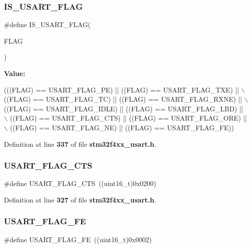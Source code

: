 \subsubsection{I\+S\+\_\+\+U\+S\+A\+R\+T\+\_\+\+F\+L\+AG}
{\footnotesize\ttfamily \#define I\+S\+\_\+\+U\+S\+A\+R\+T\+\_\+\+F\+L\+AG(\begin{DoxyParamCaption}\item[{}]{F\+L\+AG }\end{DoxyParamCaption})}

{\bfseries Value\+:}
\begin{DoxyCode}
(((FLAG) == USART_FLAG_PE) || ((FLAG) == USART_FLAG_TXE) || \(\backslash\)
                             ((FLAG) == USART_FLAG_TC) || ((FLAG) == 
      USART_FLAG_RXNE) || \(\backslash\)
                             ((FLAG) == USART_FLAG_IDLE) || ((FLAG) == 
      USART_FLAG_LBD) || \(\backslash\)
                             ((FLAG) == USART_FLAG_CTS) || ((FLAG) == 
      USART_FLAG_ORE) || \(\backslash\)
                             ((FLAG) == USART_FLAG_NE) || ((FLAG) == 
      USART_FLAG_FE))
\end{DoxyCode}


Definition at line \textbf{ 337} of file \textbf{ stm32f4xx\+\_\+usart.\+h}.

\mbox{\label{group__USART__Flags_ga94b7272319cca88a65075d5cb6048441}} 
\subsubsection{U\+S\+A\+R\+T\+\_\+\+F\+L\+A\+G\+\_\+\+C\+TS}
{\footnotesize\ttfamily \#define U\+S\+A\+R\+T\+\_\+\+F\+L\+A\+G\+\_\+\+C\+TS~((uint16\+\_\+t)0x0200)}



Definition at line \textbf{ 327} of file \textbf{ stm32f4xx\+\_\+usart.\+h}.

\mbox{\label{group__USART__Flags_ga3551a32bac49a2ec040e5fdafcc9c4bd}} 
\subsubsection{U\+S\+A\+R\+T\+\_\+\+F\+L\+A\+G\+\_\+\+FE}
{\footnotesize\ttfamily \#define U\+S\+A\+R\+T\+\_\+\+F\+L\+A\+G\+\_\+\+FE~((uint16\+\_\+t)0x0002)}



